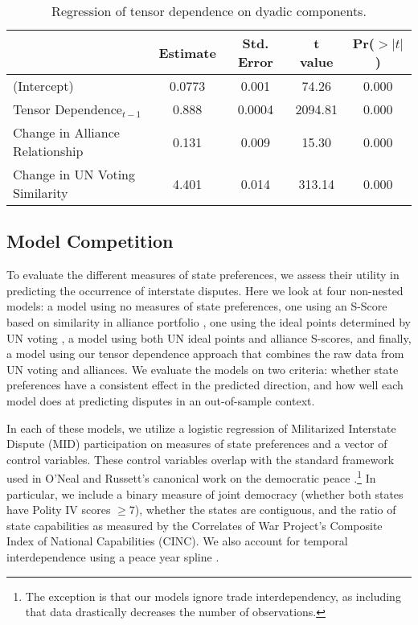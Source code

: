 \begin{table}[ht]
	\centering
	\begin{tabular}{lcccc}
		\hline
		& Estimate & Std. Error & t value & Pr($>|t|$) \\
		\hline
		(Intercept) & 0.0773 & 0.001 & 74.26 & 0.000 \\
		Tensor Dependence$_{t-1}$ & 0.888 & 0.0004 & 2094.81 & 0.000 \\
		Change in Alliance Relationship & 0.131 & 0.009 & 15.30 & 0.000 \\
		Change in UN Voting Similarity & 4.401 & 0.014 & 313.14 & 0.000 \\
		\hline
	\end{tabular}
	\caption{Regression of tensor dependence on dyadic components.}
	\label{tensor:ols}
\end{table}

\subsection*{Model Competition}

To evaluate the different measures of state preferences, we assess their utility in predicting the occurrence of interstate disputes. Here we look at four non-nested models: a model using no measures of state preferences, one using an S-Score based on similarity in alliance portfolio \citep{signorino:ritter:1999}, one using the ideal points determined by UN voting \citep{bailey:etal:2015}, a model using both UN ideal points and alliance S-scores, and finally, a model using our tensor dependence approach that combines the raw data from UN voting and alliances. We evaluate the models on two criteria: whether state preferences have a consistent effect in the predicted direction, and how well each model does at predicting disputes in an out-of-sample context.

In each of these models, we utilize a logistic regression of Militarized Interstate Dispute (MID) participation on measures of state preferences and a vector of control variables. These control variables overlap with the standard framework used in O'Neal and Russett's canonical work on the democratic peace \citep{oneal:russett:1997}.\footnote{The exception is that our models ignore trade interdependency, as including that data drastically decreases the number of observations.} In particular, we include a binary measure of joint democracy (whether both states have Polity IV scores $\geq 7$), whether the states are contiguous, and the ratio of state capabilities as measured by the Correlates of War Project's Composite Index of National Capabilities (CINC). We also account for temporal interdependence using a peace year spline \citep{carter:signorino:2010}.

